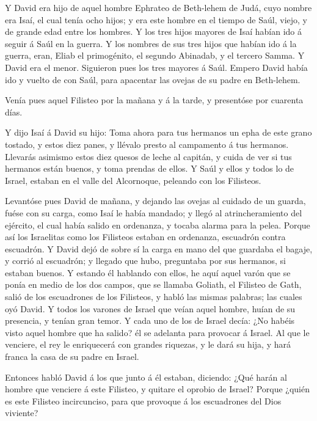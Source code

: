  Y David era hijo de aquel hombre Ephrateo de Beth-lehem de
Judá, cuyo nombre era Isaí, el cual tenía ocho hijos; y era este hombre
en el tiempo de Saúl, viejo, y de grande edad entre los hombres.
 Y los tres hijos mayores de Isaí habían ido á seguir á
Saúl en la guerra. Y los nombres de sus tres hijos que habían ido á la
guerra, eran, Eliab el primogénito, el segundo Abinadab, y el tercero
Samma.  Y David era el menor. Siguieron pues los tres
mayores á Saúl.  Empero David había ido y vuelto de con
Saúl, para apacentar las ovejas de su padre en Beth-lehem.

 Venía pues aquel Filisteo por la mañana y á la tarde, y
presentóse por cuarenta días.

 Y dijo Isaí á David su hijo: Toma ahora para tus hermanos
un epha de este grano tostado, y estos diez panes, y llévalo presto al
campamento á tus hermanos.  Llevarás asimismo estos diez
quesos de leche al capitán, y cuida de ver si tus hermanos están buenos,
y toma prendas de ellos.  Y Saúl y ellos y todos lo de
Israel, estaban en el valle del Alcornoque, peleando con los Filisteos.

 Levantóse pues David de mañana, y dejando las ovejas al
cuidado de un guarda, fuése con su carga, como Isaí le había mandado; y
llegó al atrincheramiento del ejército, el cual había salido en
ordenanza, y tocaba alarma para la pelea.  Porque así los
Israelitas como los Filisteos estaban en ordenanza, escuadrón contra
escuadrón.  Y David dejó de sobre sí la carga en mano del
que guardaba el bagaje, y corrió al escuadrón; y llegado que hubo,
preguntaba por sus hermanos, si estaban buenos.  Y estando
él hablando con ellos, he aquí aquel varón que se ponía en medio de los
dos campos, que se llamaba Goliath, el Filisteo de Gath, salió de los
escuadrones de los Filisteos, y habló las mismas palabras; las cuales
oyó David.  Y todos los varones de Israel que veían aquel
hombre, huían de su presencia, y tenían gran temor.  Y cada
uno de los de Israel decía: ¿No habéis visto aquel hombre que ha salido?
él se adelanta para provocar á Israel. Al que le venciere, el rey le
enriquecerá con grandes riquezas, y le dará su hija, y hará franca la
casa de su padre en Israel.

 Entonces habló David á los que junto á él estaban,
diciendo: ¿Qué harán al hombre que venciere á este Filisteo, y quitare
el oprobio de Israel? Porque ¿quién es este Filisteo incircunciso, para
que provoque á los escuadrones del Dios viviente?

